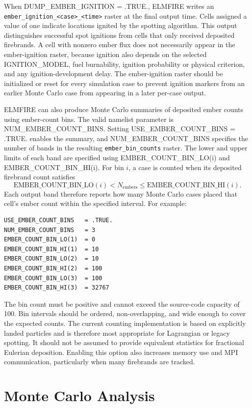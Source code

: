 When DUMP\_EMBER\_IGNITION = .TRUE., ELMFIRE writes an \texttt{ember\_ignition\_<case>\_<time>} raster at the final output time. Cells assigned a value of one indicate locations ignited by the spotting algorithm. This output distinguishes successful spot ignitions from cells that only received deposited firebrands. A cell with nonzero ember flux does not necessarily appear in the ember-ignition raster, because ignition also depends on the selected IGNITION\_MODEL, fuel burnability, ignition probability or physical criterion, and any ignition-development delay. The ember-ignition raster should be initialized or reset for every simulation case to prevent ignition markers from an earlier Monte Carlo case from appearing in a later per-case output.

ELMFIRE can also produce Monte Carlo summaries of deposited ember counts using ember-count bins. The valid namelist parameter is NUM\_EMBER\_COUNT\_BINS. Setting USE\_EMBER\_COUNT\_BINS = .TRUE. enables the summary, and NUM\_EMBER\_COUNT\_BINS specifies the number of bands in the resulting \texttt{ember\_bin\_counts} raster. The lower and upper limits of each band are specified using EMBER\_COUNT\_BIN\_LO(i) and EMBER\_COUNT\_BIN\_HI(i). For bin \(i\), a case is counted when its deposited firebrand count satisfies
\[
  \mathrm{EMBER\_COUNT\_BIN\_LO}(i)
  < N_{\mathrm{embers}}
  \leq
  \mathrm{EMBER\_COUNT\_BIN\_HI}(i) .
\]
Each output band therefore reports how many Monte Carlo cases placed that cell's ember count within the specified interval. For example:

\begin{verbatim}
USE_EMBER_COUNT_BINS   = .TRUE.
NUM_EMBER_COUNT_BINS   = 3
EMBER_COUNT_BIN_LO(1)  = 0
EMBER_COUNT_BIN_HI(1)  = 10
EMBER_COUNT_BIN_LO(2)  = 10
EMBER_COUNT_BIN_HI(2)  = 100
EMBER_COUNT_BIN_LO(3)  = 100
EMBER_COUNT_BIN_HI(3)  = 32767
\end{verbatim}

The bin count must be positive and cannot exceed the source-code capacity of 100. Bin intervals should be ordered, non-overlapping, and wide enough to cover the expected counts. The current counting implementation is based on explicitly landed particles and is therefore most appropriate for Lagrangian or legacy spotting. It should not be assumed to provide equivalent statistics for fractional Eulerian deposition. Enabling this option also increases memory use and MPI communication, particularly when many firebrands are tracked.

\section{Monte Carlo Analysis}

